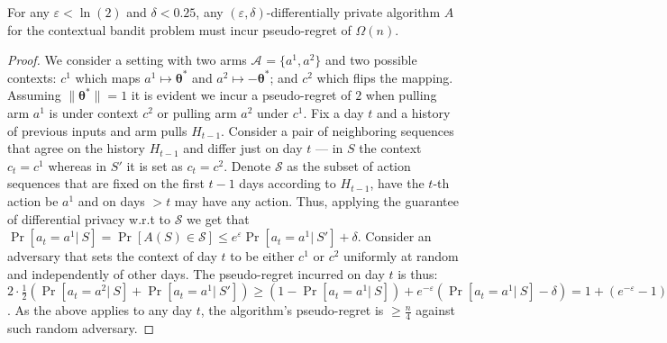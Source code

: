 \documentclass{article}
\renewcommand{\vec}[1]{\bm{#1}}
\newcommand{\Aset}[1]{\mathcal{A}_{#1}}
\begin{document}
\begin{claim}
\label{clm:standard_contextual_DP_implies_linear_regret}
For any $\varepsilon < \ln(2)$ and $\delta < 0.25$, any $(\varepsilon,\delta)$-differentially private algorithm $A$ for the contextual bandit problem must incur pseudo-regret of $\Omega(n)$.
\end{claim}
\begin{proof}
We consider a setting with two arms $\Aset{}=\{a^1,a^2\}$ and two possible contexts: $c^1$ which maps $a^1\mapsto \vec\theta^*$ and $a^2 \mapsto -\vec\theta^*$; and $c^2$ which flips the mapping. Assuming $\|\vec\theta^*\|=1$ it is evident we incur a pseudo-regret of $2$ when pulling arm $a^1$ is under context $c^2$ or pulling arm $a^2$ under $c^1$. Fix a day $t$ and a history of previous inputs and arm pulls $H_{t-1}$. Consider a pair of neighboring sequences that agree on the history $H_{t-1}$ and differ just on day $t$ --- in $S$ the context $c_t =c^1$ whereas in $S'$ it is set as $c_t =c^2$. Denote $\mathcal{S}$ as the subset of action sequences that are fixed on the first $t-1$ days according to $H_{t-1}$, have the $t$-th action be $a^1$ and on days $>t$ may have any action. Thus, applying the guarantee of differential privacy w.r.t to $\mathcal{S}$ we get that $\Pr[a_t = a^1 |~S] = \Pr[A(S)\in \mathcal{S}] \leq e^\varepsilon \Pr[a_t=a^1 |~S'] + \delta$. Consider an adversary that sets the context of day $t$ to be either $c^1$ or $c^2$ uniformly at random and independently of other days. The pseudo-regret incurred on day $t$ is thus: $2\cdot \tfrac 1 2 \left( \Pr[a_t=a^2|~S] + \Pr[a_t=a^1|~S'] \right)  \geq (1- \Pr[a_t=a^1|~S]) + e^{-\varepsilon}(\Pr[a_t=a^1|~S]-\delta) = 1 + (e^{-\varepsilon}-1)\Pr[a_t=a^2|~S] - \delta > 1 - 1\cdot \tfrac 1 2 - \tfrac 1 4 = \tfrac 1 4$. As the above applies to any day $t$,  the algorithm's pseudo-regret is $\geq \tfrac n 4$ against such random adversary.
\end{proof}
\end{document}
